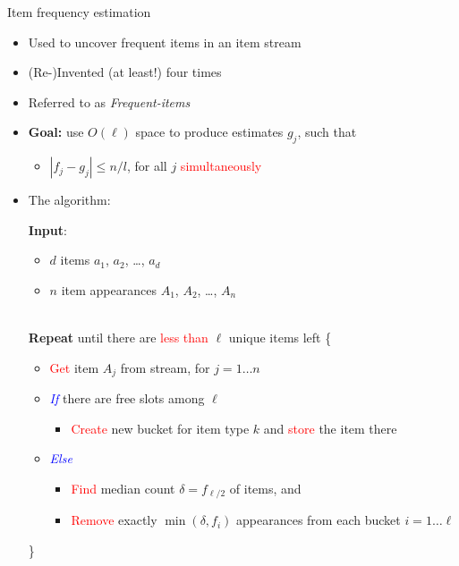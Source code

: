 \documentclass[first=dgreen,second=purple,logo=redque]{aaltoslides}
\begin{document}
\begin{frame}[allowframebreaks=1]{Item frequency estimation}
\begin{itemize}
    \item Used to uncover \textcolor{dgreen}{frequent} items in an item stream
    \item (Re-)Invented (at least!) four times \cite{Misra82, Demaine02, Karp03, Metwally05}
	\item Referred to as \textcolor{dgreen}{\textit{Frequent-items}}
\end{itemize}
\begin{itemize}
	\item \textbf{Goal:} use $O(\ell)$ space to produce estimates $g_{j}$, such
	that
	\begin{itemize}
		\item{$|f_{j} - g_{j} | \leq n/l$}, for all $j$ \textcolor{red}{simultaneously}
	\end{itemize}
\end{itemize}

\framebreak

\begin{itemize}
	\item The algorithm:
	\begin{algorithmic}
		\State \textbf{Input}:\begin{itemize}\item $d$ \textcolor{dgreen}{items} $a_{1}$, $a_{2}$, \ldots,
		$a_{d}$
		\item $n$ \textcolor{dgreen}{item appearances} $A_{1}$, $A_{2}$, \ldots,
		$A_{n}$\end{itemize}
		\\\State \textbf{Repeat} until there are \textcolor{red}{less than}
		$\ell$ \textcolor{dgreen}{unique} items left \{
		\begin{itemize}
			\item \textcolor{red}{Get} item $A_{j}$ from stream, for $j = 1 \ldots n$
		\end{itemize}
		\begin{itemize}
			\item \textcolor{blue}{\textit{If}} there are free slots among $\ell$
			\begin{itemize}\item \textcolor{red}{Create} new bucket for item type $k$ and \textcolor{red}{store} the item there\end{itemize}
			\item \textcolor{blue}{\textit{Else}}
				\begin{itemize}
					\item \textcolor{red}{Find} \textcolor{dgreen}{median} count $\delta = f_{\ell/2}$
					of items, and
					\item \textcolor{red}{Remove} exactly $\min{(\delta, f_{i})}$ appearances from each bucket $i = 1 \ldots \ell$
				\end{itemize}
		\end{itemize}
		\State \}
	\end{algorithmic}
\end{itemize}
\end{frame}
\end{document}
